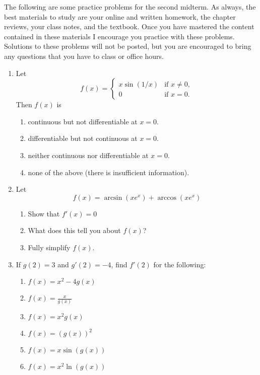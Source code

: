 \documentclass[11pt]{article}
\begin{document}
\drawtitle

The following are some practice problems for the second midterm.  As
always, the best materials to study are your online and written
homework, the chapter reviews, your class notes, and the
textbook. Once you have mastered the content contained in these
materials I encourage you practice with these problems.  Solutions to
these problems will not be posted, but you are encouraged to bring any
questions that you have to class or office hours.

\begin{enumerate}
\item Let
\[
f(x) = \begin{cases} x \sin(1/x) & \text{if } x\neq 0, \\
  0 & \text{if } x = 0. \end{cases}
\]
Then $f(x)$ is
\begin{enumerate}
\item continuous but not differentiable at $x=0$.
\item differentiable but not continuous at $x=0$.
\item neither continuous nor differentiable at $x=0$.
\item none of the above (there is insufficient information).
\end{enumerate}


\item Let
\[
f(x) = \arcsin(xe^x) + \arccos(xe^x)
\]
\begin{enumerate}
\item Show that $f'(x) = 0$
\item What does this tell you about $f(x)$?
\item Fully simplify $f(x)$.
\end{enumerate}


\item If $g(2)=3$ and $g'(2)=-4$, find $f'(2)$ for the following:
  \begin{enumerate}
  \item $f(x)=x^2-4g(x)$
  \item $f(x)=\frac{x}{g(x)}$
  \item $f(x)=x^2g(x)$
  \item $f(x)=(g(x))^2$
  \item $f(x)=x\sin(g(x))$
  \item $f(x)=x^2\ln(g(x))$
  \end{enumerate}



\end{enumerate}
\end{document}
